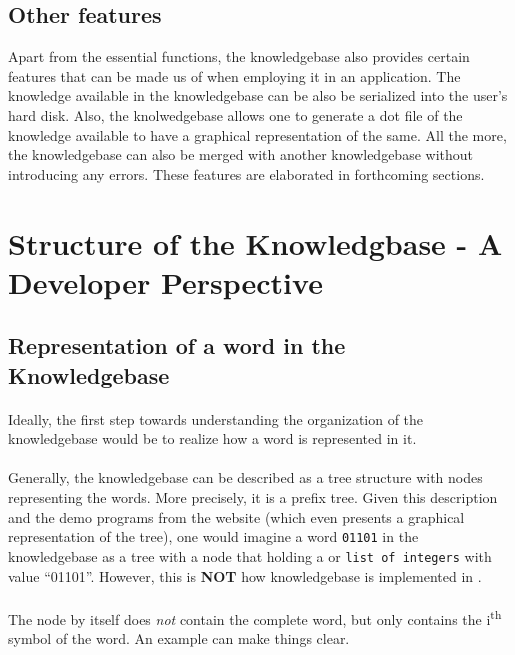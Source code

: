 \subsection*{Other features} 
Apart from the essential functions, the knowledgebase also provides certain features that can be made us of when employing it in an application. The knowledge available in the knowledgebase can be also be serialized into the user's hard disk. Also, the knolwedgebase allows one to generate a dot file of the knowledge available to have a graphical representation of the same. All the more, the knowledgebase can also be merged with another knowledgebase without introducing any errors. These features are elaborated in forthcoming sections.

\section{Structure of the Knowledgbase - A Developer Perspective}

\subsection{Representation of a word in the Knowledgebase}
\paragraph{}
	Ideally, the first step towards understanding the organization of the knowledgebase would be to realize how a word is represented in it.
\paragraph{}
	Generally, the knowledgebase can be described as a tree structure with nodes representing the words. More precisely, it is a prefix tree. Given this description and the demo programs from the website (which even presents a graphical representation of the tree), one would imagine a word \texttt{01101} in the knowledgebase as a tree with a node that holding a \stringtype or \texttt{list of integers} with value ``01101''. However, this is \textbf{NOT} how knowledgebase is implemented in \libalf.
\paragraph{}
	The node by itself does \emph{not} contain the complete word, but only contains the i\textsuperscript{th} symbol of the word. An example can make things clear. 
